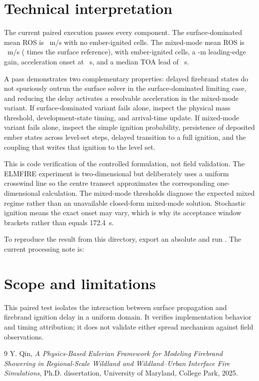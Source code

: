 \section{Technical interpretation}

The current paired execution passes every component. The surface-dominated mean ROS is ~m/s with no ember-ignited cells. The mixed-mode mean ROS is ~m/s ( times the surface reference), with  ember-ignited cells, a -m leading-edge gain, acceleration onset at ~s, and a median TOA lead of ~s.

A pass demonstrates two complementary properties: delayed firebrand states do
not spuriously outrun the surface solver in the surface-dominated limiting
case, and reducing the delay activates a resolvable acceleration in the
mixed-mode variant.
If surface-dominated variant fails alone, inspect the physical mass threshold, development-state
timing, and arrival-time update. If mixed-mode variant fails alone, inspect the simple
ignition probability, persistence of deposited ember states across level-set
steps, delayed transition to a full ignition, and the coupling that writes
that ignition to the level set.

This is code verification of the controlled formulation, not field validation.
The ELMFIRE experiment is two-dimensional but deliberately uses a
uniform crosswind line so the centre transect approximates the corresponding
one-dimensional calculation. The mixed-mode thresholds diagnose the expected
mixed regime rather than an unavailable closed-form mixed-mode solution.
Stochastic ignition means the exact onset may vary, which is why its
acceptance window brackets rather than equals \SI{172.4}{\second}.

To reproduce the result from this directory, export an absolute
 and run . The current processing note
is: 

\section{Scope and limitations}
This paired test isolates the interaction between surface propagation and firebrand ignition delay in a uniform domain. It verifies implementation behavior and timing attribution; it does not validate either spread mechanism against field observations.

\begin{thebibliography}{9}
Y. Qin, \emph{A Physics-Based Eulerian Framework for Modeling Firebrand
Showering in Regional-Scale Wildland and Wildland--Urban Interface Fire
Simulations}, Ph.D. dissertation, University of Maryland, College Park, 2025.
\end{thebibliography}
